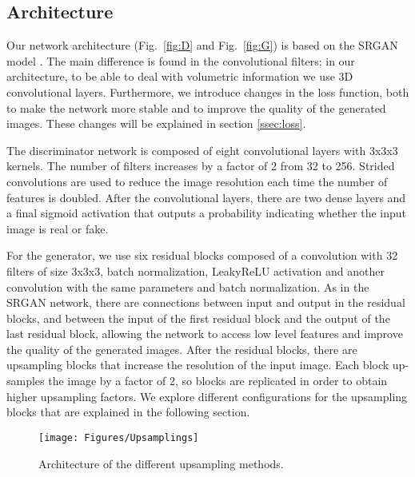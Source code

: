 \documentclass{article}
\begin{document}
\subsection{Architecture}
\label{ssec:arch}

Our network architecture (Fig.~\ref{fig:D} and Fig.~\ref{fig:G}) is based on the SRGAN model \cite{ledig:srgan}. The main difference is found in the convolutional filters; in our architecture, to be able to deal with volumetric information we use 3D convolutional layers. Furthermore, we introduce changes in the loss function, both to make the network more stable and to improve the quality of the generated images. These changes will be explained in section \ref{ssec:loss}. 

The discriminator network is composed of eight convolutional layers with 3x3x3 kernels. The number of filters increases by a factor of 2 from 32 to 256. Strided convolutions are used to reduce the image resolution each time the number of features is doubled. After the convolutional layers, there are two dense layers and a final sigmoid activation that outputs a probability indicating whether the input image is real or fake.

For the generator, we use six residual blocks composed of a convolution with 32 filters of size 3x3x3, batch normalization, LeakyReLU activation and another convolution with the same parameters and batch normalization. As in the SRGAN network, there are connections between input and output in the residual blocks, and between the input of the first residual block and the output of the last residual block, allowing the network to access low level features and improve the quality of the generated images.
After the residual blocks, there are upsampling blocks that increase the resolution of the input image. Each block up-samples the image by a factor of 2, so blocks are replicated in order to obtain higher upsampling factors. We explore different configurations for the upsampling blocks that are explained in the following section.

\begin{figure*}
   \texttt{[image: Figures/Upsamplings]}
   \caption{Architecture of the different upsampling methods.}
	\label{fig:Upsamplings}
\end{figure*}
\end{document}
